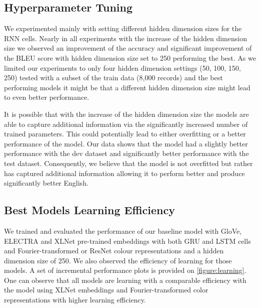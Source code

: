 \subsection{Hyperparameter Tuning}
We experimented mainly with setting different hidden dimension sizes for the RNN cells. Nearly in all experiments with the increase of the hidden dimension size we observed an improvement of the accuracy and significant improvement of the BLEU score with hidden dimension size set to 250 performing the best. As we limited our experiments to only four hidden dimension settings (50, 100, 150, 250) tested with a subset of the train data (8,000 records) and the best performing models it might be that a different hidden dimension size might lead to even better performance.

\par
It is possible that with the increase of the hidden dimension size the models are able to capture additional information via the significantly increased number of trained parameters. This could potentially lead to either overfitting or a better performance of the model. Our data shows that the model had a slightly better performance with the dev dataset and significantly better performance with the test dataset. Consequently, we believe that the model is not overfitted but rather has captured additional information allowing it to perform better and produce significantly better English.

\subsection{Best Models Learning Efficiency}
We trained and evaluated the performance of our baseline model with GloVe, ELECTRA and XLNet pre-trained embeddings with both GRU and LSTM cells and Fourier-transformed or ResNet colour representations and a hidden dimension size of 250. We also observed the efficiency of learning for those models. A set of incremental performance plots is provided on \ref{figure:learning}. One can observe that all models are learning with a comparable efficiency with the model using XLNet embeddings and Fourier-transformed color representations with higher learning efficiency.

